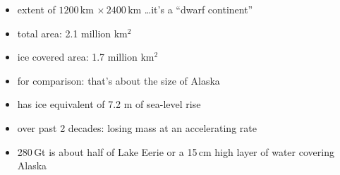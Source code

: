 \documentclass[hide notes,intlimits]{beamer}
\begin{document}
\begin{frame}[plain]
    \begin{itemize}
    \item extent of $1200\,\text{km}\,\times 2400\,\text{km}$ \dots it's a ``dwarf continent''
    \item total area: 2.1 million km$^2$
    \item ice covered area:  1.7 million km$^2$
    \item \alert{for comparison: that's about the size of Alaska}
    \item has ice equivalent of 7.2 m of sea-level rise
    \item over past 2 decades: losing mass at an accelerating rate
    \end{itemize}
\end{frame}


{
%
} 

\begin{frame}[plain]
    \begin{figure}
  \end{figure}
  \begin{itemize}
  \item<2> 280\,Gt is about half of Lake Eerie or a 15\,cm high layer of water covering Alaska
  \end{itemize}
\end{frame}
\end{document}
